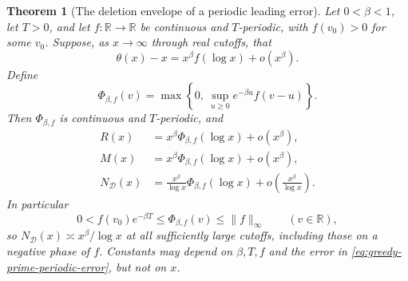\documentclass[11pt]{article}
\newtheorem{theorem}{Theorem}[section]
\theoremstyle{definition}
\begin{document}
\begin{theorem}[The deletion envelope of a periodic leading error]
\label{thm:greedy-prime-wave-envelope}
Let $0<\beta<1$, let $T>0$, and let $f:\mathbb R\to\mathbb R$
be continuous and $T$-periodic, with $f(v_0)>0$ for some $v_0$.
Suppose, as $x\to\infty$ through real cutoffs, that
\begin{equation}
 \theta(x)-x=x^\beta f(\log x)+o(x^\beta).
 \label{eq:greedy-prime-periodic-error}
\end{equation}
Define
\begin{equation}
 \Phi_{\beta,f}(v)=
   \max\left\{0,\ \sup_{u\ge0}e^{-\beta u}f(v-u)\right\}.
 \label{eq:greedy-prime-wave-envelope}
\end{equation}
Then $\Phi_{\beta,f}$ is continuous and $T$-periodic, and
\begin{equation}
 \begin{aligned}
 R(x)&=x^\beta\Phi_{\beta,f}(\log x)+o(x^\beta),\\
 M(x)&=x^\beta\Phi_{\beta,f}(\log x)+o(x^\beta),\\
 N_{\mathcal D}(x)
   &=\frac{x^\beta}{\log x}\Phi_{\beta,f}(\log x)
                      +o\left(\frac{x^\beta}{\log x}\right).
 \end{aligned}
 \label{eq:greedy-prime-wave-count}
\end{equation}
In particular
\[
 0<f(v_0)e^{-\beta T}\le\Phi_{\beta,f}(v)
                                  \le\|f\|_\infty
 \qquad(v\in\mathbb R),
\]
so $N_{\mathcal D}(x)\asymp x^\beta/\log x$ at \emph{all}
sufficiently large cutoffs, including those on a negative phase of $f$.
Constants may depend on $\beta,T,f$ and the error in
\eqref{eq:greedy-prime-periodic-error}, but not on $x$.
\end{theorem}
\end{document}
